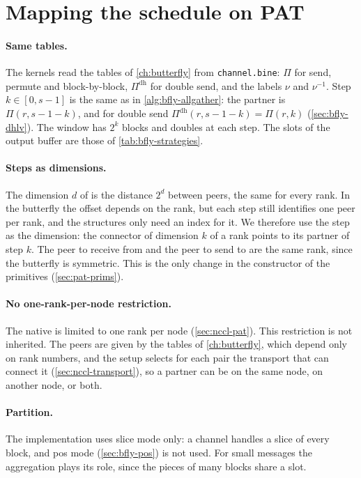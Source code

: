 \section{Mapping the schedule on PAT}\label{sec:pat-mapping}

\paragraph{Same tables.}
The kernels read the tables of \cref{ch:butterfly} from \texttt{channel.bine}: $\Pi$ for send, permute and block-by-block, $\Pi^{\mathrm{dh}}$ for double send, and the labels $\nu$ and $\nu^{-1}$.
Step $k\in[0,s-1]$ is the same as in \cref{alg:bfly-allgather}: the partner is $\Pi(r,s-1-k)$, and for double send $\Pi^{\mathrm{dh}}(r,s-1-k)=\Pi(r,k)$ (\cref{sec:bfly-dhlv}).
The window has $2^k$ blocks and doubles at each step. The slots of the output buffer are those of \cref{tab:bfly-strategies}.

\paragraph{Steps as dimensions.}
The dimension $d$ of \pat{} is the distance $2^d$ between peers, the same for every rank.
In the \bine{} butterfly the offset depends on the rank, but each step still identifies one peer per rank, and the \pat{} structures only need an index for it.
We therefore use the step as the dimension: the connector of dimension $k$ of a rank points to its partner of step $k$.
The peer to receive from and the peer to send to are the same rank, since the butterfly is symmetric. This is the only change in the constructor of the primitives (\cref{sec:pat-prims}).

\paragraph{No one-rank-per-node restriction.}
The native \pat{} is limited to one rank per node (\cref{sec:nccl-pat}). This restriction is not inherited.
The peers are given by the tables of \cref{ch:butterfly}, which depend only on rank numbers, and the \bine{} setup selects for each pair the transport that can connect it (\cref{sec:nccl-transport}), so a partner can be on the same node, on another node, or both.

\paragraph{Partition.}
The implementation uses slice mode only: a channel handles a slice of every block, and pos mode (\cref{sec:bfly-pos}) is not used.
For small messages the aggregation plays its role, since the pieces of many blocks share a slot.

